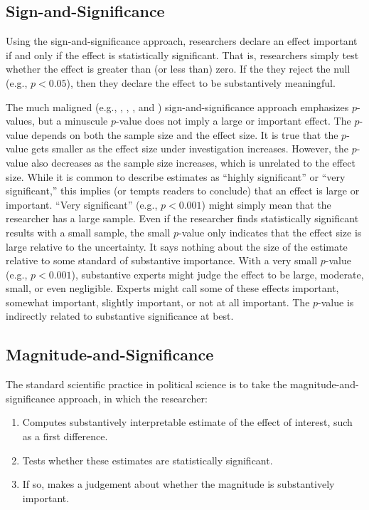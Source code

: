 \documentclass[12pt]{article}
\begin{document}
\subsection*{Sign-and-Significance}

Using the sign-and-significance approach, researchers declare an effect important if and only if the effect is statistically significant. That is, researchers simply test whether the effect is greater than (or less than) zero. If the they reject the null (e.g., $p < 0.05$), then they declare the effect to be substantively meaningful.

The much maligned (e.g., \citealt{Cohen1990}, \citealt{Gill1999}, \citealt{HillJones2014}, and \citealt{Gross2014}) sign-and-significance approach emphasizes $p$-values, but a minuscule $p$-value does not imply a large or important effect. The $p$-value depends on both the sample size and the effect size. It is true that the $p$-value gets smaller as the effect size under investigation increases. However, the $p$-value also decreases as the sample size increases, which is unrelated to the effect size. While it is common to describe estimates as ``highly significant'' or ``very significant,'' this implies (or tempts readers to conclude) that an effect is large or important. ``Very significant'' (e.g., $p < 0.001$) might simply mean that the researcher has a large sample. Even if the researcher finds statistically significant results with a small sample, the small $p$-value only indicates that the effect size is large relative to the uncertainty. It says nothing about the size of the estimate relative to some standard of substantive importance. With a very small $p$-value (e.g., $p < 0.001$), substantive experts might judge the effect to be large, moderate, small, or even negligible. Experts might call some of these effects important, somewhat important, slightly important, or not at all important. The $p$-value is indirectly related to substantive significance at best.

\subsection*{Magnitude-and-Significance}

The standard scientific practice in political science is to take the magnitude-and-significance approach, in which the researcher: 

\begin{enumerate}
\item Computes substantively interpretable estimate of the effect of interest, such as a first difference.
\item Tests whether these estimates are statistically significant.
\item If so, makes a judgement about whether the magnitude is substantively important.
\end{enumerate}
\end{document}
